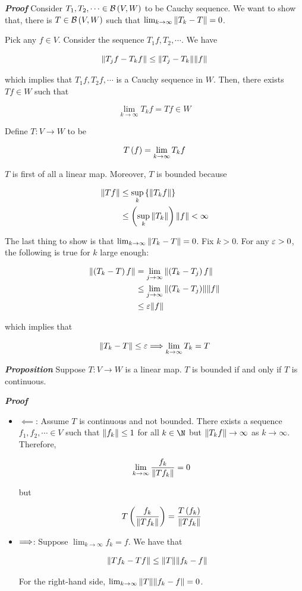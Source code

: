 \documentclass[
]{article}
\begin{document}
\emph{\textbf{Proof}} Consider \(T_1,T_2,\cdots\in \mathcal B\left({V,W}\right)\) to be
Cauchy sequence. We want to show that, there is \(T\in \mathcal B\left(V,W\right)\) such
that \(\lim_{k\to\infty}\|{T_k-T}\| = 0\).

Pick any \(f\in V\). Consider the sequence \(T_1f,T_2,\cdots\). We have

\[\|{T_jf-T_kf}\|\le \|{T_j-T_k}\|\|{f}\|\]

which implies that \(T_1f,T_2f,\cdots\) is a Cauchy sequence in \(W\).
Then, there exists \(Tf\in W\) such that

\[\lim_{k\to\infty}T_kf = Tf\in W\]

Define \(T:V\to W\) to be

\[T\left(f\right) = \lim_{k\to\infty}T_kf\]

\(T\) is first of all a linear map. Moreover, \(T\) is bounded because

\[\begin{aligned}
\|{Tf}\| & \le \sup_k\left\{\|{T_kf}\|\right\}\\
& \le \left(\sup_{k}\|{T_k}\|\right)\|{f}\|<\infty
\end{aligned}\]

The last thing to show is that \(\lim_{k\to\infty}\|{T_k-T}\| = 0\).
Fix \(k>0\). For any \(\varepsilon>0\), the following is true for \(k\) large
enough:

\[\begin{aligned}
\|{\left(T_k-T\right)f}\| & = \lim_{j\to\infty}\|{\left(T_k-T_j\right)f}\|\\
& \le \lim_{j\to\infty}\|{\left(T_k-T_j\right)}\|\|{f}\|\\
& \le \varepsilon\|{f}\|
\end{aligned}\]

which implies that

\[\|{T_k-T}\|\le \varepsilon \Longrightarrow \lim_{k\to\infty}T_k = T\]

\emph{\textbf{Proposition}} Suppose \(T:V\to W\) is a linear map. \(T\)
is bounded if and only if \(T\) is continuous.

\emph{\textbf{Proof}}

\begin{itemize}
\item
  \(\impliedby\): Assume \(T\) is continuous and not bounded. There
  exists a sequence \(f_1,f_2,\cdots\in V\) such that
  \(\|{f_k}\|\le 1\) for all \(k\in \N\) but \(\|{T_kf}\|\to\infty\)
  as \(k\to\infty\). Therefore,

  \[\lim_{k\to\infty} \frac{f_k}{\|{Tf_k}\|}=0\]

  but

  \[T\left(\frac{f_k}{\|{Tf_k}\|}\right) = \frac{T\left(f_k\right)}{\|{Tf_k}\|}\]
\item
  \(\Longrightarrow\): Suppose \(\lim_{k\to\infty}f_k = f\). We have that

  \[\begin{aligned}
  \|{Tf_k-Tf}\| & \le \|{T}\|\|{f_k-f}\|
  \end{aligned}\]

  For the right-hand side,
  \(\lim_{k\to\infty}\|{T}\|\|{f_k-f}\| = 0\).
\end{itemize}
\end{document}
